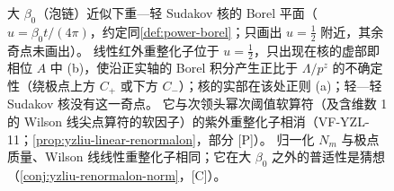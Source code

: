 \begin{figure}[htbp]
\caption{大 $\beta_0$（泡链）近似下重—轻 Sudakov 核的 Borel 平面（$u=\beta_0t/(4\pi)$，约定同\cref{def:power-borel}；只画出 $u=\frac12$ 附近，其余奇点未画出）。
线性红外重整化子位于 $u=\frac12$，只出现在核的虚部即相位 $A$ 中 (b)，使沿正实轴的 Borel 积分产生正比于 $\Lambda/p^z$ 的不确定性（绕极点上方 $C_+$ 或下方 $C_-$）；核的实部在该处正则 (a)；轻—轻 Sudakov 核没有这一奇点。
它与次领头幂次阈值软算符（及含维数 1 的 Wilson 线尖点算符的软因子）的紫外重整化子相消（VF-YZL-11；\cref{prop:yzliu-linear-renormalon}，部分 [P]）。
归一化 $N_m$ 与极点质量、Wilson 线线性重整化子相同；它在大 $\beta_0$ 之外的普适性是猜想（\cref{conj:yzliu-renormalon-norm}，[C]）。}
\label{fig:yzliu-borel}
\end{figure}

